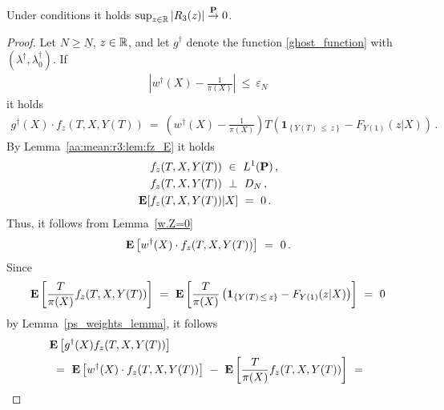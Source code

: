 \begin{lemma}
  \label{aa:mean:r3:lem:conv}
  Under conditions it holds
  $\sup_{z\in\mathbb{R}}\left| R_3(z) \right|\overset{\mathbf{P}}{\to}0$.
\end{lemma}
\begin{proof}
  Let $N\ge\underline{N}$,
  $z\in\mathbb{R}$,
  and 
  let
  $g^\dagger$ 
  denote the function \eqref{ghost_function} with 
  $
(\lambda^\dagger,\lambda_0^\dagger)
  $.
  If
  \begin{gather*}
    \left| 
    w^\dagger(X)- \frac{1}{\pi(X)} 
    \right|
    \ 
    \le
    \ 
    \varepsilon_N
  \end{gather*}
  it holds
  \begin{gather*}
    g^\dagger
    (X)
    \cdot
    f_z
    (T,X,Y(T))
    \ 
    =
    \ 
  \left( 
      w^\dagger(X)
      -
      \frac{1}{\pi(X)}
  \right)
      T
      \left( 
        \mathbf{1}
        _{\left\{  Y(T)\,\le\,z \right\}}
        -
        F_{Y(1)}(z|X)
      \right)
      \,.
  \end{gather*}
  By Lemma~\ref{aa:mean:r3:lem:fz_E}
  it holds 
  \begin{align*}
    &
  f_z(T,X,Y(T))
  \ 
  \in
  \ 
  L^1(\P)\,, 
  \\
  &
  f_z(T,X,Y(T))
  \ 
  \perp
  \ 
  D_N
  \,,
  \\
  \E
  [
  &
  f_z(T,X,Y(T))
    |X
  ]
  \ 
  =
  \ 
  0
  \,.
  \end{align*}
  Thus, 
  it follows from Lemma~\ref{w.Z=0}
  \begin{gather*}
    \E
    \left[
      w^\dagger(X)
      \cdot
      f_z(T,X,Y(T))
    \right]
    \ 
    =
    \ 
    0
    \,.
  \end{gather*}
  Since
  \begin{gather*}
    \E
    \left[
      \frac{T}{\pi(X)}
      f_z(T,X,Y(T))
    \right]
    \ 
    =
    \ 
    \E
    \left[
      \frac{T}{\pi(X)}
      \left( 
        \mathbf{1}
        _{\left\{  Y(T)\,\le\,z \right\}}
        -
        F_{Y(1)}(z|X)
      \right)
    \right]
    \  
    =
    \ 
    0
  \end{gather*}
  by Lemma~\ref{ps_weights_lemma},
  it follows
  \begin{align*}
    &
  \E
  \left[
    g^\dagger(X)
    f_z(T,X,Y(T))
  \right]
  \\
    &
  \ 
  =
  \ 
    \E
    \left[
      w^\dagger(X)
      \cdot
      f_z(T,X,Y(T))
    \right]
    \ 
    -
    \ 
    \E
    \left[
      \frac{T}{\pi(X)}
      f_z(T,X,Y(T))
    \right]
    \ 
    =
    \ 

\end{align*}
\end{proof}
